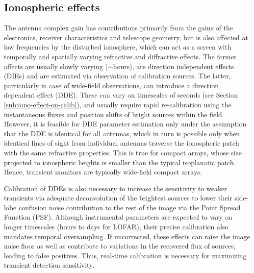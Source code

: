 \documentclass{aa}
\begin{document}
\subsection{\label{sub:All-Sky-cal-iono}Ionospheric effects}

The  antenna complex  gain has  contributions primarily  from the  gains  of the
electronics,  receiver  characteristics  and  telescope geometry,  but  is  also
affected at  low frequencies  by the  disturbed ionosphere, which  can act  as a
screen with temporally and spatially varying refractive and diffractive effects.
The  former affects  are  usually slowly  varying  ($\sim$hours), are  direction
independent  effects (DIEs)  and are  estimated via  observation  of calibration
sources.  The  latter, particularly  in  case  of  wide-field observations,  can
introduce a direction  dependent effect (DDE).  These can  vary on timescales of
seconds (see Section  \ref{sub:iono-effect-on-calib}), and usually require rapid
re-calibration  using the  instantaneous fluxes  and position  shifts  of bright
sources within the field.  However,  it is feasible for DDE parameter estimation
only under the  assumption that the DDE is identical for  all antennas, which in
turn is  possible only  when identical lines  of sight from  individual antennas
traverse the  ionospheric patch  with the same  refractive properties.   This is
true for compact arrays, whose  size projected to ionospheric heights is smaller
than  the typical isoplanatic  patch.  Hence,  transient monitors  are typically
wide-field compact arrays.

Calibration  of DDEs is  also necessary  to increase  the sensitivity  to weaker
transients via  adequate deconvolution of  the brightest sources to  lower their
side-lobe confusion  noise contribution to the  rest of the image  via the Point
Spread Function (PSF).  Although instrumental parameters are expected to vary on
longer  timescales (hours  to days  for LOFAR),  their precise  calibration also
mandates  temporal oversampling.  If uncorrected,  these effects  can  raise the
image noise floor  as well as contribute to variations in  the recovered flux of
sources, leading  to false positives.  Thus, real-time  calibration is necessary
for maximizing transient detection sensitivity.

\end{document}
